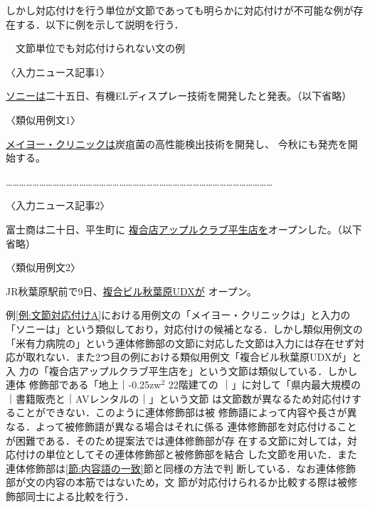 \documentclass[japanese]{jnlp_1.4}
\newcounter{exp}
\def\exp#1{}
\begin{document}
しかし対応付けを行う単位が文節であっても明らかに対応付けが不可能な例が存
在する．以下に例を示して説明を行う．
\begin{screen}
\exp{例:文節対応付けA}　文節単位でも対応付けられない文の例

〈入力ニュース記事1〉

{\setlength{\leftskip}{2zw}
\ul{ソニーは}二十五日、有機ELディスプレー技術を開発したと発表。（以下省略）
\par}

〈類似用例文1〉

{\setlength{\leftskip}{2zw}
\setnami{}\ul{メイヨー・クリニックは}炭疽菌の高性能検出技術を開発し、
 今秋にも発売を開始する。
\par}

…………………………………………………………………………………………………………

〈入力ニュース記事2〉

{\setlength{\leftskip}{2zw}
富士商は二十日、平生町に\setnami{}
\ul{複合店アップルクラブ平生店を}オープンした。（以下省略）
\par}

〈類似用例文2〉

{\setlength{\leftskip}{2zw}
JR秋葉原駅前で9日、\setnami{}\ul{\mbox{複合ビル秋葉原UDXが}} オープン。
\par}
\end{screen}
例\ref{例:文節対応付けA}における用例文の「メイヨー・クリニックは」と入力の
「ソニーは」という類似しており，対応付けの候補となる．しかし類似用例文の
「米有力病院の」という連体修飾部の文節に対応した文節は入力には存在せず対
応が取れない．また2つ目の例における類似用例文「複合ビル秋葉原UDXが」と入
力の「複合店アップルクラブ平生店を」という文節は類似している．しかし連体
    修飾部である「地上｜\kern-0.25zw$^{2}$ 22階建ての
｜」に対して「県内最大規模の｜書籍販売と｜AVレンタルの｜」という文節
は文節数が異なるため対応付けすることができない．このように連体修飾部は被
修飾語によって内容や長さが異なる．よって被修飾語が異なる場合はそれに係る
連体修飾部を対応付けることが困難である．そのため提案法では連体修飾部が存
在する文節に対しては，対応付けの単位としてその連体修飾部と被修飾部を結合
した文節を用いた．また連体修飾部は\ref{節:内容語の一致}節と同様の方法で判
断している．なお連体修飾部が文の内容の本筋ではないため，文
節が対応付けられるか比較する際は被修飾部同士による比較を行う．
\end{document}
